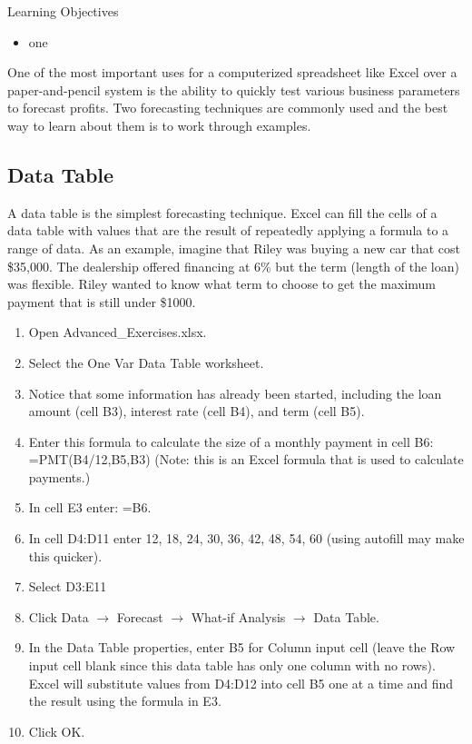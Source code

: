 \begin{center}
	\begin{objbox}{Learning Objectives}
		\begin{itemize}
			\setlength{\itemsep}{0pt}
			\setlength{\parskip}{0pt}
			\setlength{\parsep}{0pt}
			
			\item one
			
		\end{itemize}
	\end{objbox}
\end{center}

One of the most important uses for a computerized spreadsheet like Excel over a paper-and-pencil system is the ability to quickly test various business parameters to forecast profits. Two forecasting techniques are commonly used and the best way to learn about them is to work through examples. 

\subsection{Data Table}

A data table is the simplest forecasting technique. Excel can fill the cells of a data table with values that are the result of repeatedly applying a formula to a range of data. As an example, imagine that Riley was buying a new car that cost \$35,000. The dealership offered financing at 6\% but the term (length of the loan) was flexible. Riley wanted to know what term to choose to get the maximum payment that is still under \$1000.

\begin{enumerate}
	\item Open Advanced\_Exercises.xlsx.
	\item Select the One Var Data Table worksheet.
	\item Notice that some information has already been started, including the loan amount (cell B3), interest rate (cell B4), and term (cell B5).
	\item Enter this formula to calculate the size of a monthly payment in cell B6: =PMT(B4/12,B5,B3) (Note: this is an Excel formula that is used to calculate payments.)
	\item In cell E3 enter: =B6.
	\item In cell D4:D11 enter 12, 18, 24, 30, 36, 42, 48, 54, 60 (using autofill may make this quicker).
	\item Select D3:E11
	\item Click Data $\rightarrow$ Forecast $\rightarrow$ What-if Analysis $\rightarrow$ Data Table.
	\item In the Data Table properties, enter B5 for Column input cell (leave the Row input cell blank since this data table has only one column with no rows). Excel will substitute values from D4:D12 into cell B5 one at a time and find the result using the formula in E3.
	\item Click OK.
\end{enumerate}

